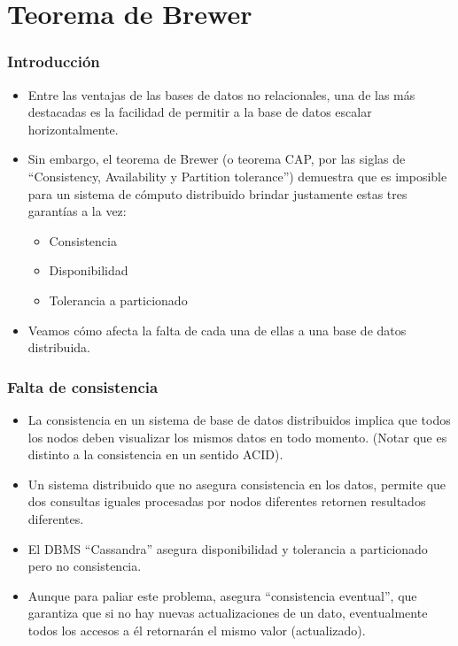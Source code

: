 \section{Teorema de Brewer}

\begin{frame}
\frametitle{Introducción}
\begin{itemize}

\item	Entre las ventajas de las bases de datos no relacionales, una de las más destacadas es la facilidad de permitir a la base de datos escalar horizontalmente. \pause

\item	Sin embargo, el teorema de Brewer (o teorema CAP, por las siglas de ``Consistency, Availability y Partition tolerance'') demuestra que es imposible para un sistema de cómputo distribuido brindar justamente estas tres garantías a la vez:
		\begin{itemize}
			\item	Consistencia
			\item	Disponibilidad
			\item	Tolerancia a particionado
		\end{itemize}
		\pause
\item	Veamos cómo afecta la falta de cada una de ellas a una base de datos distribuida.

\end{itemize}
\end{frame}

\begin{frame}
\frametitle{Falta de consistencia}
\begin{itemize}

	\item	La consistencia en un sistema de base de datos distribuidos implica que todos los nodos deben visualizar los mismos datos en todo momento.
		(Notar que es distinto a la consistencia en un sentido ACID).\pause
	\item	Un sistema distribuido que no asegura consistencia en los datos, permite que dos consultas iguales procesadas por nodos diferentes retornen resultados diferentes. \pause
	\item	El DBMS ``Cassandra'' asegura disponibilidad y tolerancia a particionado pero no consistencia. \pause
	\item	Aunque para paliar este problema, asegura ``consistencia eventual'', que garantiza que si no hay nuevas actualizaciones de un dato, eventualmente todos los accesos a él retornarán el mismo valor (actualizado).

\end{itemize}
\end{frame}

